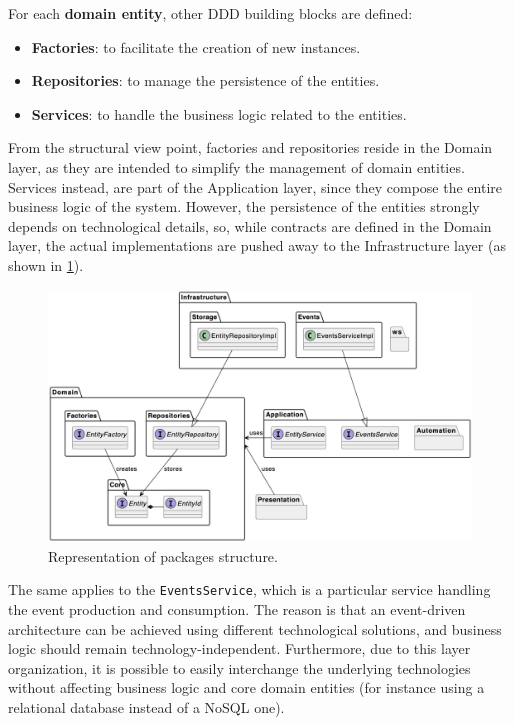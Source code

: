 \documentclass[12pt,a4paper,openright,twoside]{book}
\begin{document}
\vspace{1cm}
\noindent
For each \textbf{domain entity}, other \ac{DDD} building blocks are defined:

\begin{itemize}
    \item \textbf{Factories}: to facilitate the creation of new instances.
    \item \textbf{Repositories}: to manage the persistence of the entities.
    \item \textbf{Services}: to handle the business logic related to the entities.
\end{itemize}

From the structural view point, factories and repositories reside in the Domain layer, as they are intended to simplify the management of domain entities.
%
Services instead, are part of the Application layer, since they compose the entire business logic of the system.
%
However, the persistence of the entities strongly depends on technological details, so, while contracts are defined in the Domain layer, the actual implementations are pushed away to the Infrastructure layer (as shown in \cref{fig:packages}).

\begin{figure}
    \centering
    \includegraphics[width=\linewidth]{figures/diagrams/packages.png}
    \caption{
        Representation of packages structure.
    }
    \label{fig:packages}
\end{figure}

The same applies to the \texttt{EventsService}, which is a particular service handling the event production and consumption.
%
The reason is that an event-driven architecture can be achieved using different technological solutions, and business logic should remain technology-independent.
%
Furthermore, due to this layer organization, it is possible to easily interchange the underlying technologies without affecting business logic and core domain entities (for instance using a relational database instead of a NoSQL one).
\end{document}
